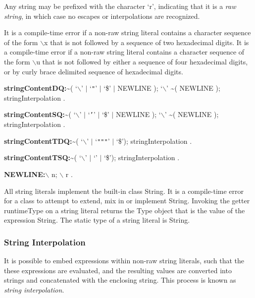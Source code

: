 \documentclass{article}
\newcommand{\code}[1]{{\sf #1}}
\begin{document}
\LMHash{}
Any string may be prefixed with the character `r', indicating that it is a {\em raw string}, in which case no escapes or interpolations are recognized.

\LMHash{}
It is a compile-time error if a non-raw string literal contains a character sequence of the form $\backslash$x that is not followed by a sequence of two hexadecimal digits. It is a compile-time error if a non-raw string literal  contains a character sequence of the form $\backslash$u that is not followed by either a sequence of four hexadecimal digits, or by curly brace delimited sequence of hexadecimal digits.



\begin{grammar}
 {\bf stringContentDQ:}\~{}( `$\backslash$' $|$ `{\escapegrammar \texttt{"}}' $|$ `\$' $|$ NEWLINE );
      `$\backslash$'  \~{}( NEWLINE );
     stringInterpolation
    .

 {\bf stringContentSQ:}\~{}( `$\backslash$' $|$ `{\escapegrammar \texttt{'}}' $|$ `\$' $|$ NEWLINE );
      `$\backslash$'  \~{}( NEWLINE );
     stringInterpolation
    .

    
 {\bf stringContentTDQ:}\~{}( `$\backslash$' $|$  `{\escapegrammar \texttt{"""}}' $|$ `\$');
     stringInterpolation
    .    

 {\bf stringContentTSQ:}\~{}( `$\backslash$' $|$ `{\escapegrammar \code{'}\code{'}\code{'}}' $|$ `\$');
     stringInterpolation
    .
    
{\bf NEWLINE:}$\backslash$ n;
      $\backslash$ r
    .

 \end{grammar}
 
\LMHash{}
All string literals implement the built-in class \code{String}. It is a compile-time error for a class to attempt to extend, mix in or implement \code{String}. Invoking the getter \code{runtimeType} on a string literal returns the \code{Type} object that is the value of the expression \code{String}. The static type of a string literal is \code{String}.

\subsubsection{String Interpolation}

\LMHash{}
It is possible to embed expressions within non-raw string literals, such that the these expressions are evaluated, and the resulting values are converted into strings and concatenated with the enclosing string. This process is known as {\em string interpolation}.
\end{document}
